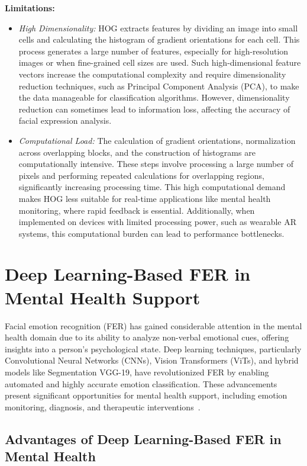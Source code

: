 \documentclass[lettersize,journal]{IEEEtran}
\begin{document}
\textbf{Limitations:}
\begin{itemize}
    \item \emph{High Dimensionality:} HOG extracts features by dividing an image into small cells and calculating the histogram of gradient orientations for each cell. This process generates a large number of features, especially for high-resolution images or when fine-grained cell sizes are used. Such high-dimensional feature vectors increase the computational complexity and require dimensionality reduction techniques, such as Principal Component Analysis (PCA), to make the data manageable for classification algorithms. However, dimensionality reduction can sometimes lead to information loss, affecting the accuracy of facial expression analysis.
    \item \emph{Computational Load:} The calculation of gradient orientations, normalization across overlapping blocks, and the construction of histograms are computationally intensive. These steps involve processing a large number of pixels and performing repeated calculations for overlapping regions, significantly increasing processing time. This high computational demand makes HOG less suitable for real-time applications like mental health monitoring, where rapid feedback is essential. Additionally, when implemented on devices with limited processing power, such as wearable AR systems, this computational burden can lead to performance bottlenecks.
\end{itemize}

\section{Deep Learning-Based FER in Mental Health Support}

Facial emotion recognition (FER) has gained considerable attention in the mental health domain due to its ability to analyze non-verbal emotional cues, offering insights into a person’s psychological state. Deep learning techniques, particularly Convolutional Neural Networks (CNNs), Vision Transformers (ViTs), and hybrid models like Segmentation VGG-19, have revolutionized FER by enabling automated and highly accurate emotion classification. These advancements present significant opportunities for mental health support, including emotion monitoring, diagnosis, and therapeutic interventions~\cite{Dada2023, Vignesh2023}.

\subsection*{Advantages of Deep Learning-Based FER in Mental Health}
\end{document}
